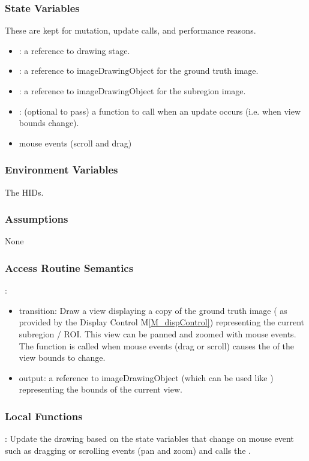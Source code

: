 \documentclass[12pt, titlepage]{article}
\newcommand{\mref}[1]{M\ref{#1}}
\begin{document}
\subsubsection{State Variables}
These are kept for mutation, update calls, and performance reasons.
\begin{itemize}
  \item {}: a reference to drawing stage.
  \item {}: a reference to imageDrawingObject for the ground truth image.
  \item {}: a reference to imageDrawingObject for the subregion image.
  \item {}: (optional to pass) a function to call when an update occurs
    (i.e. when view bounds change).
  \item mouse events (scroll and drag)
\end{itemize}

\subsubsection{Environment Variables}
The HIDs.

\subsubsection{Assumptions}
None

\subsubsection{Access Routine Semantics}

\noindent {}:
\begin{itemize}
\item transition: Draw a view displaying a copy of the ground truth image
  ( as provided by the Display Control \mref{M_dispControl})
  representing the current subregion / ROI.
  This view can be panned and zoomed with mouse events.
  The  function is called when mouse events (drag or scroll)
  causes the of the view bounds to change.
\item output: a reference to  imageDrawingObject
  (which can be used like ) representing the bounds of the current view.
\end{itemize}

\subsubsection{Local Functions}
: Update the drawing based on the state variables that change on mouse event
  such as dragging or scrolling events (pan and zoom) and calls the .
\end{document}

